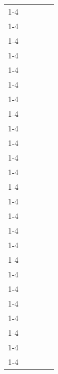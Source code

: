 \begin{table}[H]
\begin{tabular}{|l|l|l|l|l}
     &                  &      &                  &  \\ \cline{1-4}
     &                  &      &                  &  \\ \cline{1-4}
     &                  &      &                  &  \\ \cline{1-4}
     &                  &      &                  &  \\ \cline{1-4}
     &                  &      &                  &  \\ \cline{1-4}
     &                  &      &                  &  \\ \cline{1-4}
     &                  &      &                  &  \\ \cline{1-4} 
     &                  &      &                  &  \\ \cline{1-4}
     &                  &      &                  &  \\ \cline{1-4}
     &                  &      &                  &  \\ \cline{1-4}
     &                  &      &                  &  \\ \cline{1-4}
     &                  &      &                  &  \\ \cline{1-4}
     &                  &      &                  &  \\ \cline{1-4}
     &                  &      &                  &  \\ \cline{1-4}
     &                  &      &                  &  \\ \cline{1-4}
     &                  &      &                  &  \\ \cline{1-4}
     &                  &      &                  &  \\ \cline{1-4}
     &                  &      &                  &  \\ \cline{1-4}
     &                  &      &                  &  \\ \cline{1-4}
     &                  &      &                  &  \\ \cline{1-4}
     &                  &      &                  &  \\ \cline{1-4}
     &                  &      &                  &  \\ \cline{1-4}
     &                  &      &                  &  \\ \cline{1-4}
     &                  &      &                  &  \\ \cline{1-4}
     &                  &      &                  &  \\ \cline{1-4} 

\end{tabular}
\end{table}